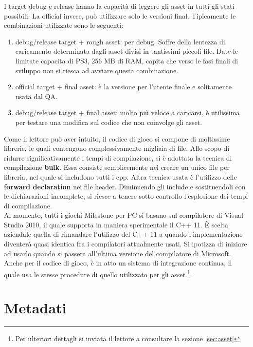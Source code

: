 I target debug e release hanno la capacità di leggere gli asset in tutti gli stati possibili. La official invece, può utilizzare solo le versioni final. Tipicamente le combinazioni utilizzate sono le seguenti:
\begin{enumerate}
	\item debug/release target + rough asset: per debug. Soffre della lentezza di caricamento determinata dagli asset divisi in tantissimi piccoli file. Date le limitate capacita di PS3, 256 MB di RAM, capita che verso le fasi finali di sviluppo non si riesca ad avviare questa combinazione.
	\item official target + final asset: è la versione per l'utente finale e solitamente usata dal QA.
	\item debug/release target + final asset: molto più veloce a caricarsi, è utilissima per testare una modifica sul codice che non coinvolge gli asset.
\end{enumerate}

Come il lettore può aver intuito, il codice di gioco si compone di moltissime librerie, le quali contengono complessivamente migliaia di file. Allo scopo di ridurre significativamente i tempi di compilazione, si è adottata la tecnica di compilazione \textbf{bulk}. Essa consiste semplicemente nel creare un unico file per libreria, nel quale si includono tutti i cpp. Altra tecnica usata è l'utilizzo delle \textbf{forward declaration} nei file header. Diminuendo gli include e sostituendoli con le dichiarazioni incomplete, si riesce a tenere sotto controllo l'esplosione dei tempi di compilazione.\\

Al momento, tutti i giochi Milestone per PC si basano sul compilatore di Visual Studio 2010, il quale supporta in maniera sperimentale il C++ 11. È scelta aziendale quella di rimandare l'utilizzo del C++ 11 a quando l'implementazione diventerà quasi identica fra i compilatori attualmente usati. Si ipotizza di iniziare ad usarlo quando si passera all'ultima versione del compilatore di Microsoft.\\

Anche per il codice di gioco, è in atto un sistema di integrazione continua, il quale usa le stesse procedure di quello utilizzato per gli asset.\footnote{Per ulteriori dettagli si inviata il lettore a consultare la sezione \ref{sec:asset}}.

\section{Metadati}

